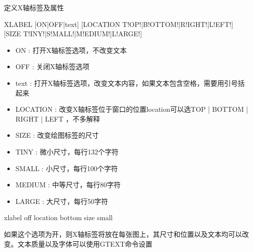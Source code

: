 \label{cmd:xlabel}

定义X轴标签及属性

\begin{SACSTX}
XLABEL [ON|OFF|text] [LOCATION T!OP!|B!OTTOM!|R!IGHT!|L!EFT!] 
    [SIZE T!INY!|S!MALL!|M!EDIUM!|L!ARGE!]
\end{SACSTX}

\begin{itemize}
\item ON : 打开X轴标签选项，不改变文本 
\item OFF : 关闭X轴标签选项 
\item text : 打开X轴标签选项，改变文本内容，如果文本包含空格，需要用引号括起来
\item LOCATION : 改变X轴标签位于窗口的位置location可以选TOP | BOTTOM | RIGHT | LEFT ，不多解释
\item SIZE :  改变绘图标签的尺寸 
\item TINY : 微小尺寸，每行132个字符
\item SMALL :  小尺寸，每行100个字符 
\item MEDIUM : 中等尺寸，每行80字符 
\item LARGE : 大尺寸，每行50字符 
\end{itemize}

\begin{SACDFT}
xlabel off location bottom size small
\end{SACDFT}

如果这个选项为开，则X轴标签将放在每张图上，其尺寸和位置以及文本均可以改变。文本质量以及字体可以使用GTEXT命令设置

